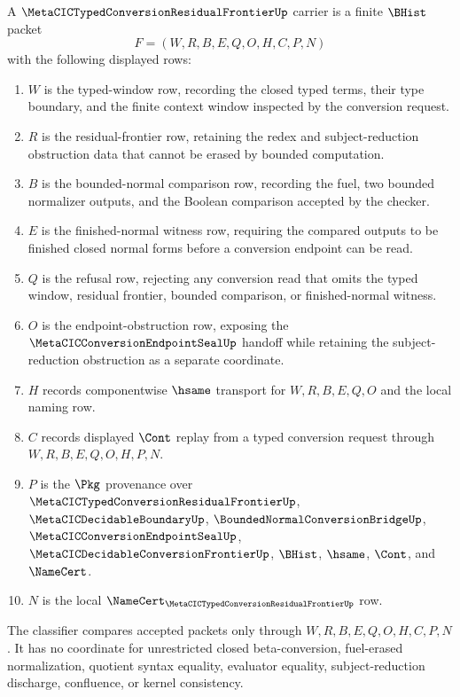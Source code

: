 \begin{definition}
\label{def:metacic-typed-conversion-residual-frontier-carrier}
A $\MetaCICTypedConversionResidualFrontierUp$ carrier is a finite $\BHist$ packet
$$
F=(W,R,B,E,Q,O,H,C,P,N)
$$
with the following displayed rows:
\begin{enumerate}
\item $W$ is the typed-window row, recording the closed typed terms, their type boundary, and the finite context window inspected by the conversion request.
\item $R$ is the residual-frontier row, retaining the redex and subject-reduction obstruction data that cannot be erased by bounded computation.
\item $B$ is the bounded-normal comparison row, recording the fuel, two bounded normalizer outputs, and the Boolean comparison accepted by the checker.
\item $E$ is the finished-normal witness row, requiring the compared outputs to be finished closed normal forms before a conversion endpoint can be read.
\item $Q$ is the refusal row, rejecting any conversion read that omits the typed window, residual frontier, bounded comparison, or finished-normal witness.
\item $O$ is the endpoint-obstruction row, exposing the $\MetaCICConversionEndpointSealUp$ handoff while retaining the subject-reduction obstruction as a separate coordinate.
\item $H$ records componentwise $\hsame$ transport for $W,R,B,E,Q,O$ and the local naming row.
\item $C$ records displayed $\Cont$ replay from a typed conversion request through $W,R,B,E,Q,O,H,P,N$.
\item $P$ is the $\Pkg$ provenance over $\MetaCICTypedConversionResidualFrontierUp$, $\MetaCICDecidableBoundaryUp$, $\BoundedNormalConversionBridgeUp$, $\MetaCICConversionEndpointSealUp$, $\MetaCICDecidableConversionFrontierUp$, $\BHist$, $\hsame$, $\Cont$, and $\NameCert$.
\item $N$ is the local $\NameCert_{\MetaCICTypedConversionResidualFrontierUp}$ row.
\end{enumerate}
The classifier compares accepted packets only through $W,R,B,E,Q,O,H,C,P,N$. It has no coordinate for unrestricted closed beta-conversion, fuel-erased normalization, quotient syntax equality, evaluator equality, subject-reduction discharge, confluence, or kernel consistency.
\end{definition}

